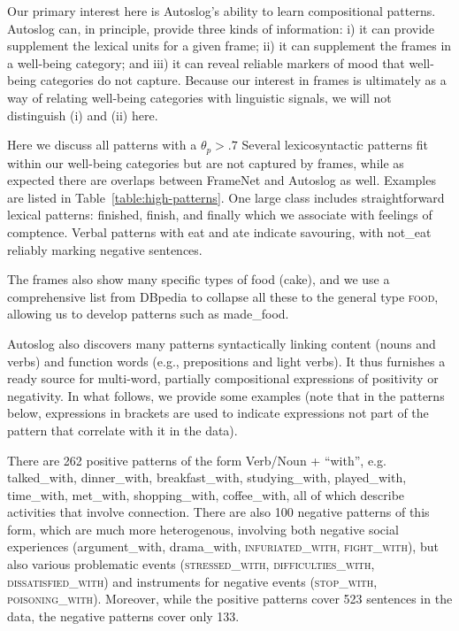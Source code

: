 \documentclass[11pt,letterpaper]{article}
\begin{document}
Our primary interest here is Autoslog's ability to learn compositional
patterns.  Autoslog can, in principle, provide three kinds of
information: i) it can provide supplement the lexical units for a
given frame; ii) it can supplement the frames in a well-being
category; and iii) it can reveal reliable markers of mood that
well-being categories do not capture. Because our interest in frames
is ultimately as a way of relating well-being categories with
linguistic signals, we will not distinguish (i) and (ii) here.

Here we discuss all patterns with a $\theta_p>.7$ Several
lexicosyntactic patterns fit within our well-being categories but are
not captured by frames, while as expected there are overlaps between
FrameNet and Autoslog as well.  Examples are listed in
Table~\ref{table:high-patterns}.  One large class includes
straightforward lexical patterns: {\sc finished, finish}, and {\sc finally}
which we associate with feelings of comptence.
Verbal patterns with {\sc eat} and {\sc ate} indicate savouring, with
{\sc not\_eat} reliably marking negative sentences.

The frames also show many specific types of food (cake), and we use
a comprehensive list from DBpedia \cite{Lehmann2014} to collapse all these
to the general type \textsc{food}, allowing us to develop patterns such as {\sc made\_food}.


Autoslog also discovers many patterns syntactically linking content
(nouns and verbs) and function words (e.g., prepositions and light
verbs). It thus furnishes a ready source for multi-word, partially
compositional expressions of positivity or negativity. In what follows,
we provide some examples (note that in the patterns below, expressions in 
brackets are used to indicate expressions not part of the pattern that correlate
with it in the data). 

There are 262 positive patterns of the form Verb/Noun + ``with'', e.g.
{\sc talked\_with}, {\sc dinner\_with}, {\sc breakfast\_with}, {\sc
  studying\_with}, {\sc played\_with}, {\sc time\_with}, {\sc
  met\_with}, {\sc shopping\_with}, {\sc coffee\_with}, all of which
describe activities that involve connection. There are
also 100 negative patterns of this form, which are much more heterogenous,
involving both negative social experiences ({\sc argument\_with}, {\sc drama\_with},
\textsc{infuriated\_with}, \textsc{fight\_with}), but also various problematic events
(\textsc{stressed\_with}, \textsc{difficulties\_with}, \textsc{dissatisfied\_with}) and instruments
for negative events (\textsc{stop\_with}, \textsc{poisoning\_with}). Moreover, while the
positive patterns cover 523 sentences in the data, the negative
patterns cover only 133.
\end{document}
